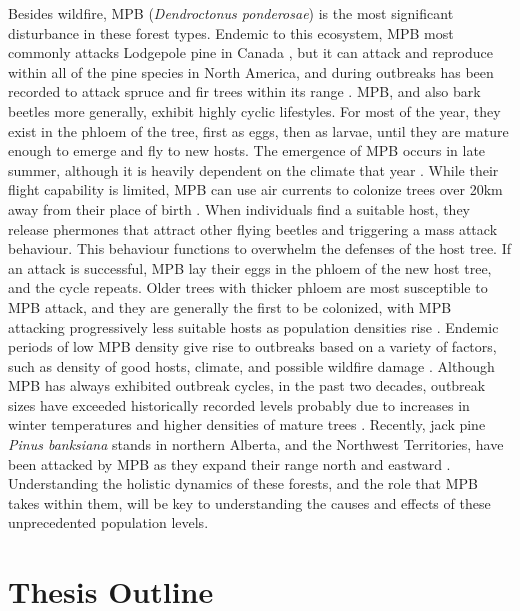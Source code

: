 Besides wildfire, MPB (\textit{Dendroctonus ponderosae}) is the most significant disturbance in these forest types. Endemic to this ecosystem, MPB most commonly attacks Lodgepole pine in Canada \cite{safranyik2007mountain}, but it can attack and reproduce within all of the pine species in North America, and during outbreaks has been recorded to attack spruce and fir trees within its range \cite{gibson2009mountain}. MPB, and also bark beetles more generally, exhibit highly cyclic lifestyles. For most of the year, they exist in the phloem of the tree, first as eggs, then as larvae, until they are mature enough to emerge and fly to new hosts. The emergence of MPB occurs in late summer, although it is heavily dependent on the climate that year \cite{bentz2014mountain}. While their flight capability is limited, MPB can use air currents to colonize trees over 20km away from their place of birth \cite{shegelski2019morphological}. When individuals find a suitable host, they release phermones that attract other flying beetles and triggering a mass attack behaviour. This behaviour functions to overwhelm the defenses of the host tree. If an attack is successful, MPB lay their eggs in the phloem of the new host tree, and the cycle repeats. Older trees with thicker phloem are most susceptible to MPB attack, and they are generally the first to be colonized, with MPB attacking progressively less suitable hosts as population densities rise \cite{safranyik2007mountain}. Endemic periods of low MPB density give rise to outbreaks based on a variety of factors, such as density of good hosts, climate, and possible wildfire damage \cite{safranyik2007mountain}. Although MPB has always exhibited outbreak cycles, in the past two decades, outbreak sizes have exceeded historically recorded levels probably due to increases in winter temperatures and higher densities of mature trees \cite{bentz2010climate,safranyik2007mountain}. Recently, jack pine \textit{Pinus banksiana} stands in northern Alberta, and the Northwest Territories, have been attacked by MPB as they expand their range north and eastward \cite{cudmore2010climate,nrcanmpb}. Understanding the holistic dynamics of these forests, and the role that MPB takes within them, will be key to understanding the causes and effects of these unprecedented population levels. 

\section{Thesis Outline}

